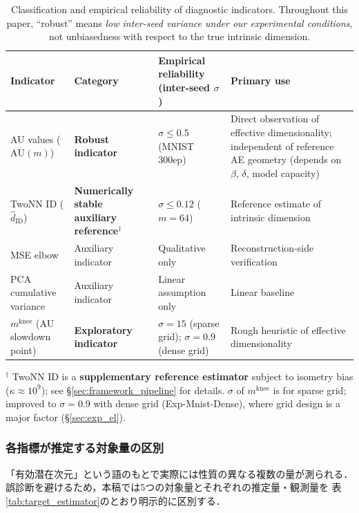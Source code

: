 \documentclass[11pt,a4paper]{jsarticle}
\newcommand{\kap}{\kappa}
\newcommand{\mknee}{m^{\mathrm{knee}}}
\begin{document}
\begin{table}[H]
\centering
\caption{Classification and empirical reliability of diagnostic indicators. Throughout this paper, ``robust'' means \textit{low inter-seed variance under our experimental conditions}, not unbiasedness with respect to the true intrinsic dimension.}
\label{tab:indicator_class}
\small
\begin{tabular}{p{3.3cm}p{3.1cm}p{3.9cm}p{4.0cm}}
\toprule
Indicator & Category & Empirical reliability (inter-seed $\sigma$) & Primary use \\
\midrule
AU values ($\mathrm{AU}(m)$) & \textbf{Robust indicator} & $\sigma \leq 0.5$ (MNIST 300ep) & Direct observation of effective dimensionality; independent of reference AE geometry (depends on $\beta$, $\delta$, model capacity) \\
TwoNN ID ($\hat{d}_\mathrm{ID}$) & \textbf{Numerically stable auxiliary reference}$^\dagger$ & $\sigma \leq 0.12$ ($m=64$) & Reference estimate of intrinsic dimension \\
MSE elbow & Auxiliary indicator & Qualitative only & Reconstruction-side verification \\
PCA cumulative variance & Auxiliary indicator & Linear assumption only & Linear baseline \\
$\mknee$ (AU slowdown point) & \textbf{Exploratory indicator} & $\sigma=15$ (sparse grid); $\sigma=0.9$ (dense grid) & Rough heuristic of effective dimensionality \\
\bottomrule
\end{tabular}
\medskip
\footnotesize
$^\dagger$ TwoNN ID is a \textbf{supplementary reference estimator} subject to isometry bias ($\kap \approx 10^9$); see §\ref{sec:framework_pipeline} for details.
$\sigma$ of $\mknee$ is for sparse grid; improved to $\sigma=0.9$ with dense grid (Exp-Mnist-Dense), where grid design is a major factor (§\ref{sec:exp_el}).
\normalsize
\end{table}

\subsubsection*{各指標が推定する対象量の区別}\label{sec:framework_targets}

「有効潜在次元」という語のもとで実際には性質の異なる複数の量が測られる．
誤診断を避けるため，本稿では5つの対象量とそれぞれの推定量・観測量を
表\ref{tab:target_estimator}のとおり明示的に区別する．
\end{document}
